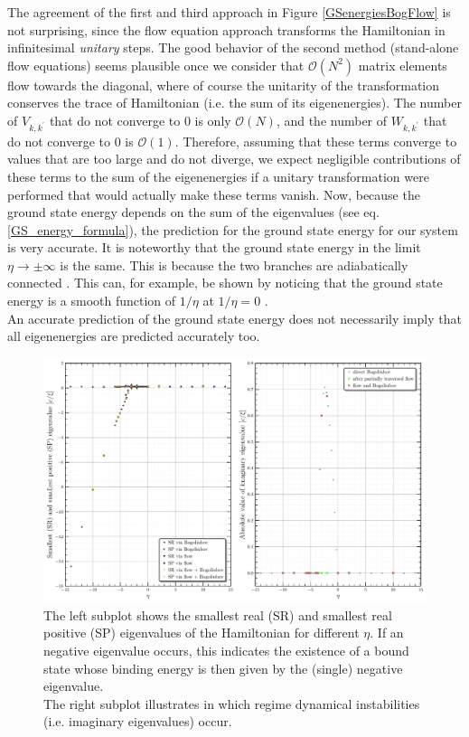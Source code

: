 The agreement of the first and third approach in Figure \ref{GSenergiesBogFlow} is not surprising, since the flow equation approach transforms the Hamiltonian in infinitesimal \emph{unitary} steps. The good behavior of the second method (stand-alone flow equations) seems plausible once we consider that $\mathcal O(N^2)$ matrix elements flow towards the diagonal, where of course the unitarity of the transformation conserves the trace of Hamiltonian (i.e. the sum of its eigenenergies). The number of $V_{k,k^\prime}$ that do not converge to 0 is only $\mathcal O(N)$, and the number of $W_{k,k^\prime}$ that do not converge to 0 is $\mathcal O(1)$. Therefore, assuming that these terms converge to values that are too large and do not diverge, we expect negligible contributions of these terms to the sum of the eigenenergies if a unitary transformation were performed that would actually make these terms vanish. Now, because the ground state energy depends on the sum of the eigenvalues (see eq. \ref{GS_energy_formula}), the prediction for the ground state energy for our system is very accurate. It is noteworthy that the ground state energy in the limit $\eta\rightarrow\pm\infty$ is the same. This is because the two branches are adiabatically connected \cite{Grusdt_2017,PhysRevA.98.033610}. This can, for example, be shown by noticing that the ground state energy is a smooth function of $1/\eta$ at $1/\eta=0$ \cite[Fig. 1]{PhysRevA.98.033610}.\\
An accurate prediction of the ground state energy does not necessarily imply that all eigenenergies are predicted accurately too. 
\begin{figure}[H]
    \centering
    \includegraphics[width=\textwidth]{figures/plots/PDF/spectrum_analysis_bog_flow_comp.pdf}
    \caption[Characteristic eigenenergies of the Bose Polaron for different $\eta$]{The left subplot shows the smallest real (SR) and smallest real positive (SP) eigenvalues of the Hamiltonian for different $\eta$. If an negative eigenvalue occurs, this indicates the existence of a bound state whose binding energy is then given by the (single) negative eigenvalue. \\
The right subplot illustrates in which regime dynamical instabilities (i.e. imaginary eigenvalues) occur.
}
    \label{SpectrumAnalysis}
\end{figure}
